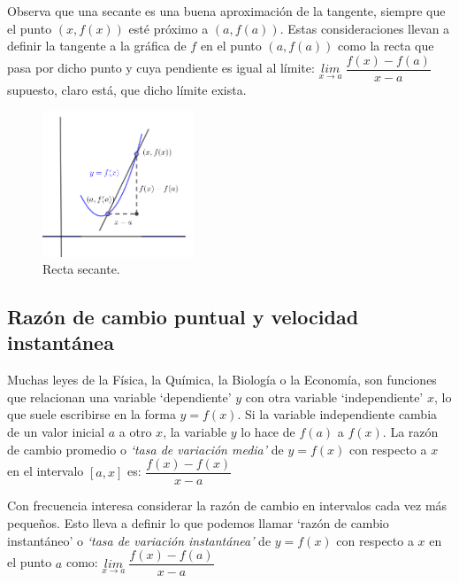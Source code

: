 	 \begin{multicols}{2}
	 	
	 

     
	Observa que una secante es una buena aproximación de la tangente, siempre que el punto $(x, f (x))$ esté próximo a $(a, f (a))$. Estas consideraciones llevan a definir la tangente a la gráfica de $f$ en el punto $(a, f (a))$ como la recta que pasa por dicho punto y cuya pendiente es igual al límite: $\underset{x\to a}{lim}\;{\dfrac {f(x)-f(a)}{x-a}}$ supuesto, claro está, que dicho límite exista. 
	
	 \begin{figure}[H]
			\centering
			\includegraphics[width=0.4\textwidth]{imagenes/imagenes04/T04IM01.png}
			\caption {Recta secante.}
		\end{figure}
   
		\end{multicols}
		
\subsection{Razón de cambio puntual y velocidad instantánea}
	  
Muchas leyes de la Física, la Química, la Biología o la Economía, son funciones que relacionan una variable `dependiente' $y$ con otra variable `independiente' $x$, lo que suele escribirse en la forma $y = f(x)$. Si la variable independiente cambia de un valor inicial $a$ a otro $x$, la variable $y$ lo hace de $f(a)$ a $f(x)$. La razón de cambio promedio o \emph{`tasa de variación media'} de $y = f(x)$ con respecto a $x$ en el intervalo $[a, x]$ es: $\dfrac {f(x)-f(x)}{x-a}$
	  
	  Con frecuencia interesa considerar la razón de cambio en intervalos cada vez más pequeños. Esto lleva a definir lo que podemos llamar `razón de cambio instantáneo' o \emph{`tasa de variación instantánea'} de $y = f (x)$ con respecto a $x$ en el punto $a$ como: $\underset {x\to a}{lim}\;{\dfrac {f(x)-f(a)}{x-a}}$


